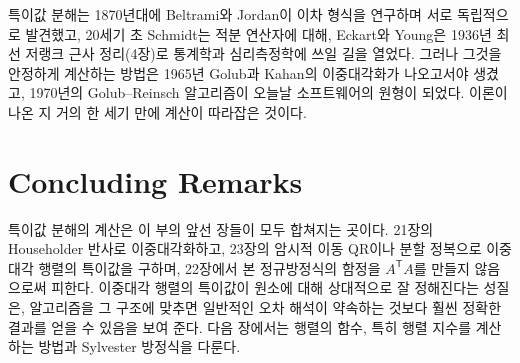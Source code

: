 \begin{aside}
특이값 분해는 1870년대에 Beltrami와 Jordan이 이차 형식을 연구하며 서로 독립적으로 발견했고, 20세기 초 Schmidt는 적분 연산자에 대해, Eckart와 Young은 1936년 최선 저랭크 근사 정리(4장)로 통계학과 심리측정학에 쓰일 길을 열었다. 그러나 그것을 안정하게 계산하는 방법은 1965년 Golub과 Kahan의 이중대각화가 나오고서야 생겼고, 1970년의 Golub--Reinsch 알고리즘이 오늘날 소프트웨어의 원형이 되었다\cite{stewart1993svdhistory}. 이론이 나온 지 거의 한 세기 만에 계산이 따라잡은 것이다.
\end{aside}

\section{Concluding Remarks}

특이값 분해의 계산은 이 부의 앞선 장들이 모두 합쳐지는 곳이다. 21장의 Householder 반사로 이중대각화하고, 23장의 암시적 이동 QR이나 분할 정복으로 이중대각 행렬의 특이값을 구하며, 22장에서 본 정규방정식의 함정을 $A^{\mathsf T}A$를 만들지 않음으로써 피한다. 이중대각 행렬의 특이값이 원소에 대해 상대적으로 잘 정해진다는 성질은, 알고리즘을 그 구조에 맞추면 일반적인 오차 해석이 약속하는 것보다 훨씬 정확한 결과를 얻을 수 있음을 보여 준다. 다음 장에서는 행렬의 함수, 특히 행렬 지수를 계산하는 방법과 Sylvester 방정식을 다룬다.

\chapterreferences
